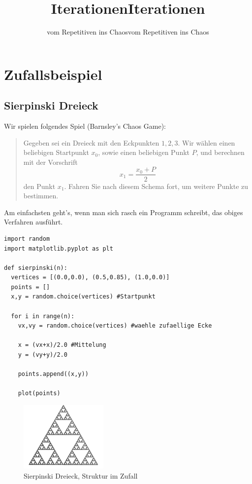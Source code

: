\documentclass[%
11pt,%
twoside,%
titlepage,%
german,%
headsepline%
]{scrartcl}
\title{Iterationen}
\subtitle{vom Repetitiven ins Chaos}
\author{}
\date{}
\title{Iterationen}
\subtitle{vom Repetitiven ins Chaos}
\author{}
\date{}
\begin{document}
\maketitle
\tableofcontents
\cleardoublepage

\section{\glqq Zufallsbeispiel\grqq}

\subsection{Sierpinski Dreieck}

Wir spielen folgendes Spiel (Barnsley's Chaos Game):
\begin{quote}
Gegeben sei ein Dreieck mit den Eckpunkten $1,2,3$. Wir w\"ahlen einen beliebigen Startpunkt $x_0$, sowie einen beliebigen Punkt $P$, und berechnen mit der Vorschrift
$$x_1=\frac{x_0+P}{2}$$
den Punkt $x_1$. Fahren Sie nach diesem Schema fort, um weitere Punkte zu bestimmen.
\end{quote}
Am einfachsten geht's, wenn man sich rasch ein Programm schreibt, das obiges Verfahren ausführt.

\begin{lstlisting}
import random
import matplotlib.pyplot as plt

def sierpinski(n):
  vertices = [(0.0,0.0), (0.5,0.85), (1.0,0.0)]
  points = []
  x,y = random.choice(vertices) #Startpunkt
  
  for i in range(n):
    vx,vy = random.choice(vertices) #waehle zufaellige Ecke
    
    x = (vx+x)/2.0 #Mittelung
    y = (vy+y)/2.0
    
    points.append((x,y))
    
    plot(points)
\end{lstlisting}

\begin{figure}[h!]
  \centering
\includegraphics[width=0.382\textwidth]{pictures/sierpinski}
\caption{Sierpinski Dreieck, Struktur im Zufall}
\end{figure}
\end{document}
